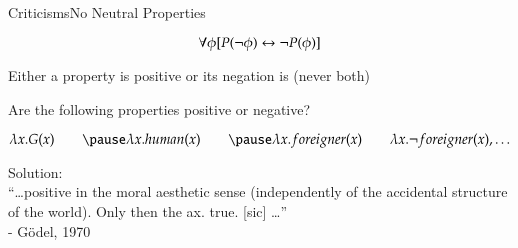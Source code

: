 \begin{frame}{Criticisms}{No Neutral Properties} \centering

$$\forall \phi [P(\neg \phi) \leftrightarrow \neg P(\phi)]$$

Either a property is positive or its negation is (never both)
		  
\pause
\bigskip

Are the following properties positive or negative?

$$
\lambda x. G(x) \qquad \pause \lambda x. human(x) \qquad \pause \lambda x. foreigner(x) \qquad \lambda x. \neg foreigner(x), \ldots
$$

\pause
\bigskip

Solution: \\
``\ldots positive in the moral aesthetic sense (independently of the accidental structure of the world). Only then the ax. true. [sic] \ldots''
\\ \hfill - G\"odel, 1970
\end{frame}


